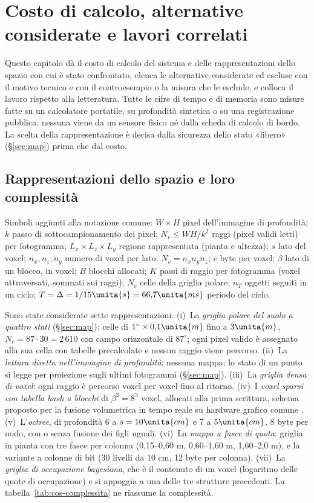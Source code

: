 \section{Costo di calcolo, alternative considerate e lavori correlati}\label{sec:cos}

Questo capitolo dà il costo di calcolo del sistema e delle rappresentazioni dello spazio con cui è stato confrontato, elenca le alternative considerate ed escluse con il motivo tecnico e con il controesempio o la misura che le esclude, e colloca il lavoro rispetto alla letteratura. Tutte le cifre di tempo e di memoria sono misure fatte su un calcolatore portatile, su profondità sintetica o su una registrazione pubblica: nessuna viene da un sensore fisico né dalla scheda di calcolo di bordo. La scelta della rappresentazione è decisa dalla sicurezza dello stato «libero» (\S\ref{sec:map}) prima che dal costo.

\subsection{Rappresentazioni dello spazio e loro complessità}\label{sec:cos-rappresentazioni}

Simboli aggiunti alla notazione comune: $W\times H$ pixel dell'immagine di profondità; $k$ passo di sottocampionamento dei pixel; $N_r\le WH/k^2$ raggi (pixel validi letti) per fotogramma; $L_x\times L_z\times L_y$ regione rappresentata (pianta e altezza); $s$ lato del voxel; $n_x,n_z,n_y$ numero di voxel per lato; $N_v=n_xn_yn_z$; $c$ byte per voxel; $\beta$ lato di un blocco, in voxel; $B$ blocchi allocati; $K$ passi di raggio per fotogramma (voxel attraversati, sommati sui raggi); $N_c$ celle della griglia polare; $n_T$ oggetti seguiti in un ciclo; $T=\Delta=1/15\unita{s}=66{,}7\unita{ms}$ periodo del ciclo.

Sono state considerate sette rappresentazioni. (i)~La \emph{griglia polare del suolo a quattro stati} (\S\ref{sec:map}): celle di $1^\circ\times0{,}1\unita{m}$ fino a $3\unita{m}$, $N_c=87\cdot30=2\,610$ con campo orizzontale di $87^\circ$; ogni pixel valido è assegnato alla sua cella con tabelle precalcolate e nessun raggio viene percorso. (ii)~La \emph{lettura diretta nell'immagine di profondità}: nessuna mappa; lo stato di un punto si legge per proiezione sugli ultimi fotogrammi (\S\ref{sec:map}). (iii)~La \emph{griglia densa di voxel}: ogni raggio è percorso voxel per voxel fino al ritorno. (iv)~I \emph{voxel sparsi con tabella hash a blocchi} di $\beta^3=8^3$ voxel, allocati alla prima scrittura, schema proposto per la fusione volumetrica in tempo reale su hardware grafico comune \cite{niessner2013}. (v)~L'\emph{octree}, di profondità 6 a $s=10\unita{cm}$ e 7 a $5\unita{cm}$, 8 byte per nodo, con o senza fusione dei figli uguali. (vi)~La \emph{mappa a fasce di quota}: griglia in pianta con tre fasce per colonna (0,15--0,60 m, 0,60--1,60 m, 1,60--2,0 m), e la variante a colonne di bit (30 livelli da 10 cm, 12 byte per colonna). (vii)~La \emph{griglia di occupazione bayesiana}, che è il contenuto di un voxel (logaritmo delle quote di occupazione) e si appoggia a una delle tre strutture precedenti. La tabella~\ref{tab:cos-complessita} ne riassume la complessità.

